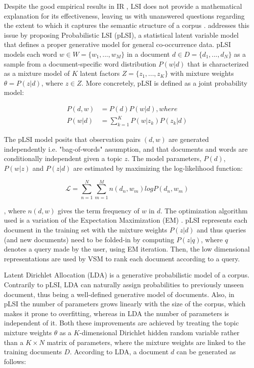 \documentclass[a4paper]{article}
\begin{document}
Despite the good empirical results in IR \citep{dumais1988, berry1995}, LSI does not provide a mathematical explanation for its effectiveness, leaving us with unanswered questions regarding the extent to which it captures the semantic structure of a corpus \citep{papadimitriou2000}. \citet{hofmann1999} addresses this issue by proposing Probabilistic LSI (pLSI), a statistical latent variable model that defines a proper generative model for general co-occurrence data. pLSI models each word $w \in W = \{w_1, ..., w_M\}$ in a document $d \in D = \{d_1, ..., d_N\}$ as a sample from a document-specific word distribution $P(w|d)$ that is characterized as a mixture model \citep[p.~337-380]{murphy2012} of $K$ latent factors $Z = \{z_1, ..., z_K\}$ with mixture weights $\theta = P(z|d)$, where $z \in Z$. More concretely, pLSI is defined as a joint probability model:

\begin{subequations}
	\begin{align}
		P(d,w) & = P(d)P(w|d), where \\
		P(w|d) & = \sum_{k=1}^K P(w|z_k)P(z_k|d)
	\end{align}
\end{subequations}

The pLSI model posits that observation pairs $(d, w)$ are generated independently i.e. "bag-of-words" assumption, and that documents and words are conditionally independent given a topic $z$. The model parameters, $P(d)$, $P(w|z)$ and $P(z|d)$ are estimated by maximizing the log-likelihood function:

\begin{equation}
	\mathcal{L} = \sum_{n=1}^N \sum_{m=1}^M n(d_n,w_m)logP(d_n,w_m) 
\end{equation}

, where $n(d,w)$ gives the term frequency of $w$ in $d$. The optimization algorithm used is a variation of the Expectation Maximization (EM) \citep[p.~348-369]{murphy2012}. pLSI represents each document in the training set with the mixture weights $P(z|d)$ and thus queries (and new documents) need to be folded-in by computing $P(z|q)$, where $q$ denotes a query made by the user, using EM iteration. Then, the low dimensional representations are used by VSM to rank each document according to a query.

Latent Dirichlet Allocation (LDA) \citep{blei2003} is a generative probabilistic model of a corpus. Contrarily to pLSI, LDA can naturally assign probabilities to previously unseen document, thus being a well-defined generative model of documents. Also, in pLSI the number of parameters grows linearly with the size of the corpus, which makes it prone to overfitting, whereas in LDA the number of parameters is independent of it. Both these improvements are achieved by treating the topic mixture weights $\theta$ as a $K$-dimensional Dirichlet hidden random variable rather than a $K\times N$ matrix of parameters, where the mixture weights are linked to the training documents $D$. According to LDA, a document $d$ can be generated as follows:
\end{document}
